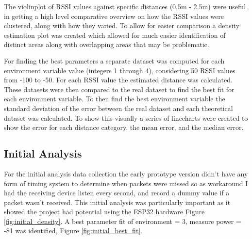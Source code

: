 \documentclass{l4proj}
\begin{document}
The violinplot of RSSI values against specific distances (0.5m - 2.5m) were useful in getting a high level comparative overview on how the RSSI values were clustered, along with how they varied. To allow for easier comparison a density estimation plot was created which allowed for much easier identification of distinct areas along with overlapping areas that may be problematic.

For finding the best parameters a separate dataset was computed for each environment variable value (integers 1 through 4), considering 50 RSSI values from -100 to -50. For each RSSI value the estimated distance was calculated. These datasets were then compared to the real dataset to find the best fit for each environment variable. To then find the best environment variable the standard deviation of the error between the real dataset and each theoretical dataset was calculated. To show this visually a series of linecharts were created to show the error for each distance category, the mean error, and the median error.

\subsection{Initial Analysis}

For the initial analysis data collection the early prototype version didn't have any form of timing system to determine when packets were missed so as workaround I had the receiving device listen every second, and record a dummy value if a packet wasn't received. This initial analysis was particularly important as it showed the project had potential using the ESP32 hardware Figure \ref{fig:initial_density}. A best parameter fit of environment = 3, measure power = -81 was identified, Figure \ref{fig:initial_best_fit}.
\end{document}
